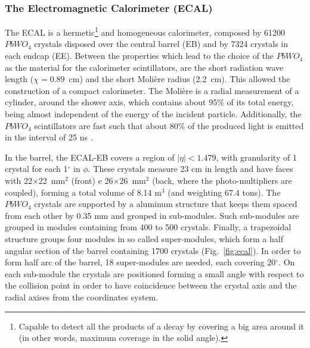 \subsubsection{The Electromagnetic Calorimeter (ECAL)}
The ECAL is a hermetic\footnote{Capable to detect all the products of a decay by covering a big area around it (in other words, maximum coverage in the solid angle).} and homogeneous calorimeter, composed by 61200 $PbWO_4$ crystals disposed over the central barrel (EB) and by 7324 crystals in each endcap (EE). Between the properties which lead to the choice of the $PbWO_4$ as the material for the calorimeter scintillators, are the short radiation wave length ($\chi=0.89$~cm) and the short Molière radius (2.2~cm). This allowed the construction of a compact calorimeter. The Molière is a radial measurement of a cylinder, around the shower axis, which contains about 95$\%$ of its total energy, being almost independent of the energy of the incident particle. Additionally, the $PbWO_4$ scintillators are fast such that about 80$\%$ of the produced light is emitted in the interval of 25 ns \cite{bib:JINST-3-362-2008,bib:grupen-2008}.

In the barrel, the ECAL-EB covers a region of $|\eta| < 1.479$, with granularity of 1 crystal for each 1$^{\circ}$ in $\phi$. These crystals measure 23 cm in length and have faces with 22$\times$22~mm$^{2}$ (front) e 26$\times$26~mm$^{2}$ (back, where the photo-multipliers are coupled), forming a total volume of 8.14 m$^{3}$ (and weighting 67.4 tons). The $PbWO_4$ crystals are supported by a aluminum structure that keeps them spaced from each other by 0.35 mm and grouped in sub-modules. Such sub-modules are grouped in modules containing from 400 to 500 crystals. Finally, a trapezoidal structure groups four modules in so called super-modules, which form a half angular section of the barrel containing 1700 crystals (Fig.~\ref{fig:ecal}). In order to form half arc of the barrel, 18 super-modules are needed, each covering 20$^{\circ}$. On each sub-module the crystals are positioned forming a small angle with respect to the collision point in order to have coincidence between the crystal axis and the radial axises from the coordinates system.

